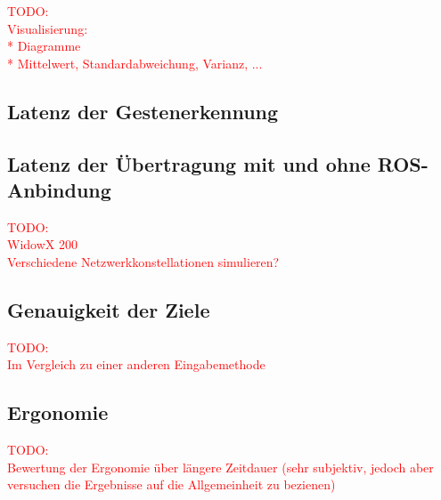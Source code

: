 














\textcolor{red}{TODO:\\
Visualisierung:\\
* Diagramme\\
* Mittelwert, Standardabweichung, Varianz, ...
}

\subsection{Latenz der Gestenerkennung}


\subsection{Latenz der Übertragung mit und ohne ROS-Anbindung}
\textcolor{red}{TODO:\\
WidowX 200\\
Verschiedene Netzwerkkonstellationen simulieren?
}

\subsection{Genauigkeit der Ziele}
\textcolor{red}{TODO:\\
Im Vergleich zu einer anderen Eingabemethode
}

\subsection{Ergonomie}
\textcolor{red}{TODO:\\
Bewertung der Ergonomie über längere Zeitdauer (sehr subjektiv, jedoch aber versuchen die Ergebnisse auf die Allgemeinheit zu bezienen)
}
